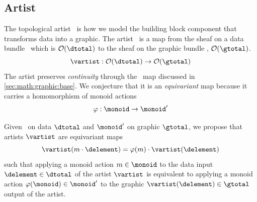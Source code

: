 \documentclass[../main.tex]{subfiles}
\begin{document}
\subsection{Artist}
\label{sec:artist}
The topological artist \vartist\ is how we model the building block component that transforms data into a graphic. The artist \vartist\ is a map from the sheaf on a data bundle \dtotal\ which is $\mathcal{O}(\dtotal)$ to the sheaf on the graphic bundle \gtotal, $\mathcal{O}(\gtotal)$. 
\begin{equation}
    \vartist: \mathcal{O}(\dtotal) \rightarrow \mathcal{O}(\gtotal)
    \label{eq:math:artist:artist}
\end{equation}
The artist preserves \textit{continuity} through the \vindex\ map discussed in \autoref{sec:math:graphic:base}. We conjecture that it is an \textit{equivariant} map because it carries a homomorphism of monoid actions \cite{cegarraCohomologyMonoidsOperators2019}
\begin{equation}
    \varphi: \monoid \rightarrow \monoid^{\prime}
\end{equation}

Given \monoid\ on data $\mathscr{\dtotal}$ and $\monoid^{\prime}$ on graphic $\mathscr{\gtotal}$, we propose that artists $\mathscr{\vartist}$ are equivariant maps 
\begin{equation}
\vartist(m\cdot \delement) = \varphi(m)\cdot \vartist(\delement) 
\end{equation}
such that applying a monoid action $m \in \monoid$ to the data input $\delement \in \mathscr{\dtotal}$ of the artist $\mathscr{\vartist}$ is equivalent to applying a monoid action $\varphi(\monoid) \in \monoid^{\prime}$ to the graphic $\vartist(\delement) \in \mathscr{\gtotal}$ output of the artist.
\end{document}
